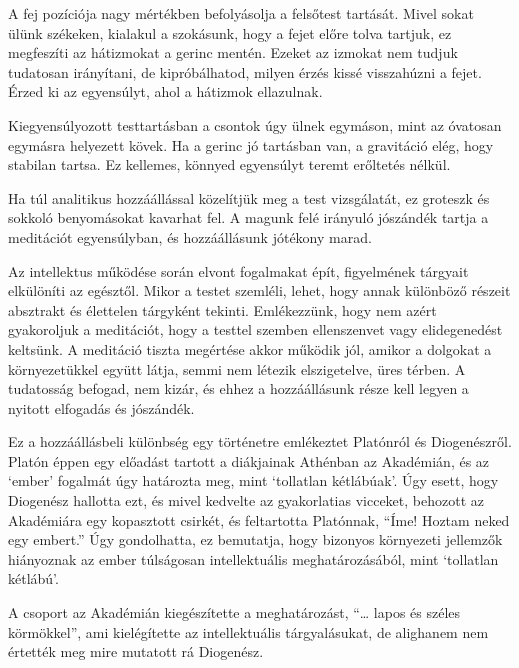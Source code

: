 A fej pozíciója nagy mértékben befolyásolja a felsőtest tartását. Mivel
sokat ülünk székeken, kialakul a szokásunk, hogy a fejet előre tolva
tartjuk, ez megfeszíti az hátizmokat a gerinc mentén. Ezeket az izmokat
nem tudjuk tudatosan irányítani, de kipróbálhatod, milyen érzés kissé
visszahúzni a fejet. Érzed ki az egyensúlyt, ahol a hátizmok ellazulnak.

Kiegyensúlyozott testtartásban a csontok úgy ülnek egymáson, mint az
óvatosan egymásra helyezett kövek. Ha a gerinc jó tartásban van, a
gravitáció elég, hogy stabilan tartsa. Ez kellemes, könnyed egyensúlyt
teremt erőltetés nélkül.

\enlargethispage*{\baselineskip}


Ha túl analitikus hozzáállással közelítjük meg a test vizsgálatát, ez
groteszk és sokkoló benyomásokat kavarhat fel. A magunk felé irányuló
jószándék tartja a meditációt egyensúlyban, és hozzáállásunk jótékony
marad.

Az intellektus működése során elvont fogalmakat épít, figyelmének
tárgyait elkülöníti az egésztől. Mikor a testet szemléli, lehet, hogy
annak különböző részeit absztrakt és élettelen tárgyként tekinti.
Emlékezzünk, hogy nem azért gyakoroljuk a meditációt, hogy a testtel
szemben ellenszenvet vagy elidegenedést keltsünk. A meditáció tiszta
megértése akkor működik jól, amikor a dolgokat a környezetükkel együtt
látja, semmi nem létezik elszigetelve, üres térben. A tudatosság
befogad, nem kizár, és ehhez a hozzáállásunk része kell legyen a nyitott
elfogadás és jószándék.

Ez a hozzáállásbeli különbség egy történetre emlékeztet Platónról és
Diogenészről. Platón éppen egy előadást tartott a diákjainak Athénban az
Akadémián, és az `ember' fogalmát úgy határozta meg, mint `tollatlan
kétlábúak'. Úgy esett, hogy Diogenész hallotta ezt, és mivel kedvelte az
gyakorlatias vicceket, behozott az Akadémiára egy kopasztott csirkét, és
feltartotta Platónnak, ``Íme! Hoztam neked egy embert.'' Úgy
gondolhatta, ez bemutatja, hogy bizonyos környezeti jellemzők hiányoznak
az ember túlságosan intellektuális meghatározásából, mint `tollatlan
kétlábú'.

A csoport az Akadémián kiegészítette a meghatározást, ``\ldots{} lapos
és széles körmökkel'', ami kielégítette az intellektuális tárgyalásukat,
de alighanem nem értették meg mire mutatott rá Diogenész.


